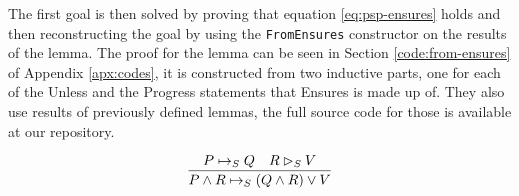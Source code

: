 The first goal is then solved by proving that equation \ref{eq:psp-ensures} holds and then reconstructing the goal by using the \verb|FromEnsures| constructor on the results of the lemma. The proof for the lemma can be seen in Section \ref{code:from-ensures} of Appendix \ref{apx:codes}, it is constructed from two inductive parts, one for each of the Unless and the Progress statements that Ensures is made up of. They also use results of previously defined lemmas, the full source code for those is available at our repository\cite{orsi-formalization-github}.

\begin{equation}
    \label{eq:psp-ensures}
    \infer{P \land R \mapsto_S (Q \land R) \lor V}{P \mapsto_S Q & R \rhd_S V}
\end{equation}

\begin{code}
    \>[2]\AgdaSpace{}%
    \AgdaSymbol{:}\AgdaSpace{}%
    \AgdaSymbol{((}\AgdaSpace{}%
    \AgdaOperator{\AgdaFunction{↪[}}\AgdaSpace{}%
    \AgdaSpace{}%
    \AgdaOperator{\AgdaFunction{]}}\AgdaSpace{}%
    \AgdaSymbol{)}\AgdaSpace{}%
    \AgdaSpace{}%
    \AgdaSymbol{(}\AgdaSpace{}%
    \AgdaOperator{\AgdaFunction{▷[}}\AgdaSpace{}%
    \AgdaSpace{}%
    \AgdaOperator{\AgdaFunction{]}}\AgdaSpace{}%
    \AgdaSymbol{))}\AgdaSpace{}%
    \AgdaSpace{}%
    \AgdaSymbol{(}\AgdaSpace{}%
    \AgdaSpace{}%
    \AgdaSymbol{)}\AgdaSpace{}%
    \AgdaOperator{\AgdaFunction{↪[}}\AgdaSpace{}%
    \AgdaSpace{}%
    \AgdaOperator{\AgdaFunction{]}}\AgdaSpace{}%
    \AgdaSymbol{((}\AgdaSpace{}%
    \AgdaSpace{}%
    \AgdaSymbol{)}\AgdaSpace{}%
    \AgdaSpace{}%
    \AgdaSymbol{)}\<%
    \\
    \\[\AgdaEmptyExtraSkip]%
    \>[2]\AgdaSpace{}%
    \AgdaSymbol{(}\AgdaSpace{}%
    \AgdaSpace{}%
    \AgdaOperator{\AgdaInductiveConstructor{,}}\AgdaSpace{}%
    \AgdaSymbol{)}\AgdaSpace{}%
    \AgdaSymbol{=}\AgdaSpace{}%
    \AgdaSpace{}%
    \AgdaSymbol{(}\AgdaSpace{}%

\end{code}
